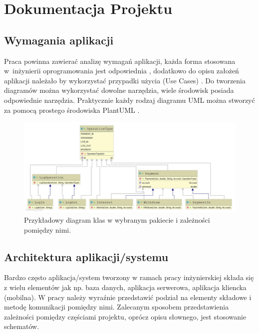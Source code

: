 \documentclass[12pt,a4paper]{article}
\begin{document}
\section{Dokumentacja Projektu}\label{dokumentacja}

\subsection{Wymagania aplikacji}
Praca powinna zawierać analizę wymagań aplikacji, każda forma stosowana w~inżynierii oprogramowania jest odpowiednia \cite{IO}, dodatkowo do opisu założeń aplikacji należało by wykorzystać przypadki użycia (Use Cases) \cite{UML}. Do tworzenia diagramów można wykorzystać dowolne narzędzia, wiele środowisk posiada odpowiednie narzędzia. Praktycznie każdy rodzaj diagramu UML można stworzyć za pomocą  prostego środowiska PlantUML \cite{plantUML}.

\begin{figure}[h]
\centering
\includegraphics[width = \textwidth]{DiagramKlasPakiet.jpg}
\caption{Przykładowy diagram klas w wybranym pakiecie i zależności pomiędzy nimi.}\label{diagram_klas_pakiet}
\end{figure}


\subsection{Architektura aplikacji/systemu}
Bardzo często aplikacja/system tworzony w ramach pracy inżynierskiej składa się z wielu elementów jak np. baza danych, aplikacja serwerowa, aplikacja kliencka (mobilna). W pracy należy wyraźnie przedstawić podział na elementy składowe i metodę komunikacji pomiędzy nimi. Zalecanym sposobem przedstawienia zależności pomiędzy częściami projektu, oprócz opisu słownego, jest stosowanie schematów.
\end{document}
